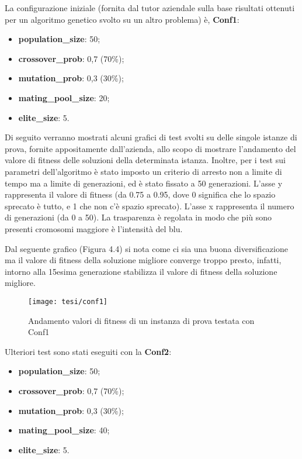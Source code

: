 \noindent La configurazione iniziale (fornita dal tutor aziendale sulla base risultati ottenuti per un algoritmo genetico svolto su un altro problema) è, \textbf{Conf1}:
\begin{itemize}
	\item\textbf{population\_size}: 50;
	\item\textbf{crossover\_prob}: 0,7 (70\%);
	\item\textbf{mutation\_prob}: 0,3 (30\%);
	\item\textbf{mating\_pool\_size}: 20;
	\item\textbf{elite\_size}: 5.
\end{itemize}

Di seguito verranno mostrati alcuni grafici di test svolti su delle singole istanze di prova, fornite appositamente dall'azienda, allo scopo di mostrare l'andamento del valore di fitness delle soluzioni della determinata istanza. Inoltre, per i test sui parametri dell'algoritmo è stato imposto un criterio di arresto non a limite di tempo ma a limite di generazioni, ed è stato fissato a 50 generazioni. 
L'asse y rappresenta il valore di fitness (da 0.75 a 0.95, dove 0 significa che lo spazio sprecato è tutto, e 1 che non c'è spazio sprecato). L'asse x rappresenta il numero di generazioni (da 0 a 50).
La trasparenza è regolata in modo che più sono presenti cromosomi maggiore è l'intensità del blu.

Dal seguente grafico (Figura 4.4) si nota come ci sia una buona diversificazione ma il valore di fitness della soluzione migliore converge troppo presto, infatti, intorno alla 15esima generazione stabilizza il valore di fitness della soluzione migliore. 

\begin{figure}[!ht] 
    \centering 
    \texttt{[image: tesi/conf1]} 
    \caption{Andamento valori di fitness di un instanza di prova testata con Conf1}
\end{figure}

Ulteriori test sono stati eseguiti con la \textbf{Conf2}:
\begin{itemize}
	\item\textbf{population\_size}: 50;
	\item\textbf{crossover\_prob}: 0,7 (70\%);
	\item\textbf{mutation\_prob}: 0,3 (30\%);
	\item\textbf{mating\_pool\_size}: 40;
	\item\textbf{elite\_size}: 5.
\end{itemize}


